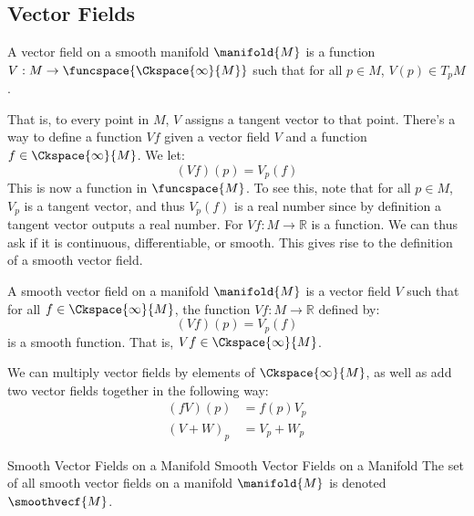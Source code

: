 \documentclass{article}                                                        %
\begin{document}
        \subsection{Vector Fields}
            \begin{definition}
                A vector field on a smooth manifold $\manifold{M}$ is a function
                $V:M\rightarrow\funcspace{\Ckspace{\infty}{M}}$ such that for
                all $p\in{M}$, $V(p)\in{T}_{p}M$.
            \end{definition}
            That is, to every point in $M$, $V$ assigns a tangent vector to that
            point. There's a way to define a function $Vf$ given a vector field
            $V$ and a function $f\in\Ckspace{\infty}{M}$. We let:
            \begin{equation}
                (Vf)(p)=V_{p}(f)
            \end{equation}
            This is now a function in $\funcspace{M}$. To see this, note that
            for all $p\in{M}$, $V_{p}$ is a tangent vector, and thus
            $V_{p}(f)$ is a real number since by definition a tangent vector
            outputs a real number. For $Vf:M\rightarrow\mathbb{R}$ is a
            function. We can thus ask if it is continuous, differentiable, or
            smooth. This gives rise to the definition of a smooth vector field.
            \begin{definition}
                A smooth vector field on a manifold $\manifold{M}$ is a vector
                field $V$ such that for all $f\in\Ckspace{\infty}{M}$, the
                function $Vf:M\rightarrow\mathbb{R}$ defined by:
                \begin{equation}
                    (Vf)(p)=V_{p}(f)
                \end{equation}
                is a smooth function. That is, $Vf\in\Ckspace{\infty}{M}$.
            \end{definition}
            We can multiply vector fields by elements of $\Ckspace{\infty}{M}$,
            as well as add two vector fields together in the following way:
            \begin{align}
                (fV)(p)&=f(p)V_{p}\\
                (V+W)_{p}&=V_{p}+W_{p}
            \end{align}
            \begin{fnotation}{Smooth Vector Fields on a Manifold}
                             {Smooth Vector Fields on a Manifold}
                The set of all smooth vector fields on a manifold $\manifold{M}$
                is denoted $\smoothvecf{M}$.
            \end{fnotation}
\end{document}
